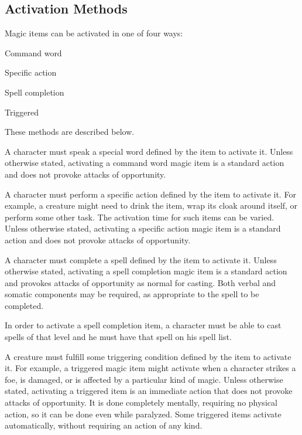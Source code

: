 \subsection{Activation Methods}
Magic items can be activated in one of four ways:

\begin{itemize*}
  \item Command word
  \item Specific action
  \item Spell completion
  \item Triggered
\end{itemize*}

These methods are described below.

 A character must speak a special word defined by the item to activate it. Unless otherwise stated, activating a command word magic item is a standard action and does not provoke attacks of opportunity.

 A character must perform a specific action defined by the item to activate it. For example, a creature might need to drink the item, wrap its cloak around itself, or perform some other task. The activation time for such items can be varied. Unless otherwise stated, activating a specific action magic item is a standard action and does not provoke attacks of opportunity.

 A character must complete a spell defined by the item to activate it. Unless otherwise stated, activating a spell completion magic item is a standard action and provokes attacks of opportunity as normal for casting. Both verbal and somatic components may be required, as appropriate to the spell to be completed.

In order to activate a spell completion item, a character must be able to cast spells of that level and he must have that spell on his spell list.

 A creature must fulfill some triggering condition defined by the item to activate it. For example, a triggered magic item might activate when a character strikes a foe, is damaged, or is affected by a particular kind of magic. Unless otherwise stated, activating a triggered item is an immediate action that does not provoke attacks of opportunity. It is done completely mentally, requiring no physical action, so it can be done even while paralyzed. Some triggered items activate automatically, without requiring an action of any kind.

